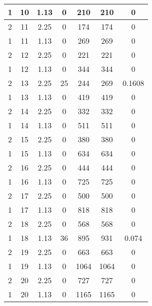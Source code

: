 \documentclass[letterpaper, 12pt]{article}
\begin{document}
\begin{longtable}{|c|c|c|c|c|c|c|}
\hline
1 & 10 & 1.13 & 0 & 210 & 210 & 0 \\
\hline
2 & 11 & 2.25 & 0 & 174 & 174 & 0 \\
\hline
1 & 11 & 1.13 & 0 & 269 & 269 & 0 \\
\hline
2 & 12 & 2.25 & 0 & 221 & 221 & 0 \\
\hline
1 & 12 & 1.13 & 0 & 344 & 344 & 0 \\
\hline
2 & 13 & 2.25 & 25 & 244 & 269 & 0.1608 \\
\hline
1 & 13 & 1.13 & 0 & 419 & 419 & 0 \\
\hline
2 & 14 & 2.25 & 0 & 332 & 332 & 0 \\
\hline
1 & 14 & 1.13 & 0 & 511 & 511 & 0 \\
\hline
2 & 15 & 2.25 & 0 & 380 & 380 & 0 \\
\hline
1 & 15 & 1.13 & 0 & 634 & 634 & 0 \\
\hline
2 & 16 & 2.25 & 0 & 444 & 444 & 0 \\
\hline
1 & 16 & 1.13 & 0 & 725 & 725 & 0 \\
\hline
2 & 17 & 2.25 & 0 & 500 & 500 & 0 \\
\hline
1 & 17 & 1.13 & 0 & 818 & 818 & 0 \\
\hline
2 & 18 & 2.25 & 0 & 568 & 568 & 0 \\
\hline
1 & 18 & 1.13 & 36 & 895 & 931 & 0.074 \\
\hline
2 & 19 & 2.25 & 0 & 663 & 663 & 0 \\
\hline
1 & 19 & 1.13 & 0 & 1064 & 1064 & 0 \\
\hline
2 & 20 & 2.25 & 0 & 727 & 727 & 0 \\
\hline
1 & 20 & 1.13 & 0 & 1165 & 1165 & 0 \\
\hline
\end{longtable}
\end{document}
